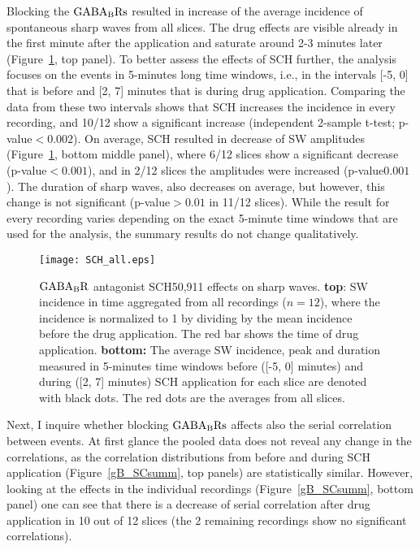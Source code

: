     Blocking the $\rm GABA_B Rs$ resulted in increase of the average incidence
    of spontaneous sharp waves from all slices.  The drug effects are visible
    already in the first minute after the application and saturate around 2-3
    minutes later (Figure~\ref{gB_summ}, top panel). To better assess the
    effects of SCH further, the analysis focuses on the events in 5-minutes
    long time windows, i.e., in the intervals [-5, 0] that is before and [2, 7]
    minutes that is during drug application. Comparing the data from these two
    intervals shows that SCH increases the incidence in every recording, and
    10/12 show a significant increase (independent 2-sample t-test;
    p-value$<0.002$). On average, SCH resulted in decrease of SW amplitudes
    (Figure~\ref{gB_summ}, bottom middle panel), where 6/12 slices show
    a significant decrease (p-value$<0.001$), and in 2/12 slices the amplitudes
    were increased (p-value$0.001$). The duration of sharp waves, also
    decreases on average, but however, this change is not significant
    (p-value$>0.01$ in 11/12 slices). While the result for every recording
    varies depending on the exact 5-minute time windows that are used for the
    analysis, the summary results do not change qualitatively.
    
    \begin{figure}
      \texttt{[image: SCH\_all.eps]}
      \caption{
        $\rm GABA_BR$ antagonist SCH50,911 effects on sharp waves. {\bf top}:
        SW incidence in time aggregated from all recordings ($n=12$), where the
        incidence is normalized to 1 by dividing by the mean incidence before
        the drug application. The red bar shows the time of drug application.
        {\bf bottom:} The average SW incidence, peak and duration measured in
        5-minutes time windows before ([-5, 0] minutes) and during ([2, 7]
        minutes) SCH application for each slice are denoted with black dots.
        The red dots are the averages from all slices.
            }
    \label{gB_summ}
    \end{figure}

    Next, I inquire whether blocking $\rm GABA_B Rs$ affects also the serial
    correlation between events. At first glance the pooled data does not reveal
    any change in the correlations, as the correlation distributions from
    before and during SCH application (Figure~\ref{gB_SCsumm}, top panels) are
    statistically similar. However, looking at the effects in the individual
    recordings (Figure~\ref{gB_SCsumm}, bottom panel) one can see that there is
    a decrease of serial correlation after drug application in 10 out of 12
    slices (the 2 remaining recordings show no significant correlations).

